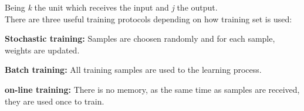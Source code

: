Being  \textit{k} the unit which receives the input and \textit{j} the output.\\

There are three useful training protocols depending on how training set is used:
\begin{description}[noitemsep,topsep=8pt,parsep=0pt,partopsep=20pt]
	\item \textbf{Stochastic training:} Samples are choosen randomly and for each sample, weights are updated.
	 \item \textbf{Batch training:} All training samples are used to the learning process.
	 \item \textbf{on-line training:} There is no memory, as the same time as samples are received, they are used once to train.
\end{description}


